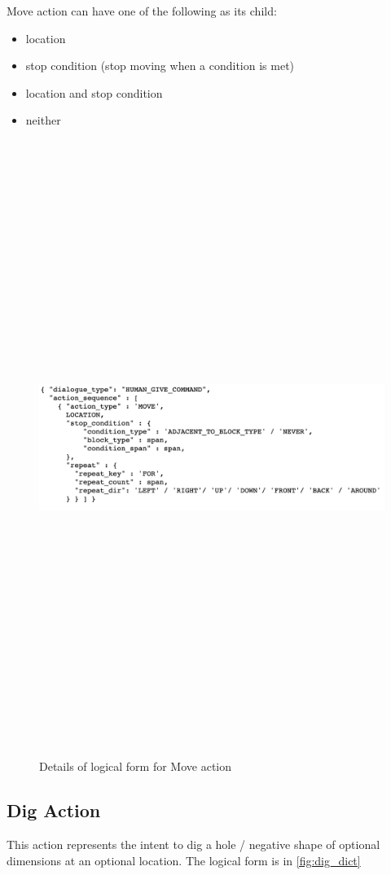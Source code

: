 Move action can have one of the following as its child:
\begin{itemize}
	\setlength\itemsep{0.0em}
	\item location
	\item stop condition (stop moving when a condition is met)
	\item location and stop condition
	\item neither
\end{itemize}
\begin{figure}[h]
    \centering
    \includegraphics[width=15cm,height=20cm,keepaspectratio]{figures/move.png}
    \caption{Details of logical form  for Move action}
    \label{fig:move_dict}
\end{figure}

\subsection{ Dig Action}
This action represents the intent to dig a hole / negative shape of optional dimensions at an optional location. The logical form is in \ref{fig:dig_dict}


